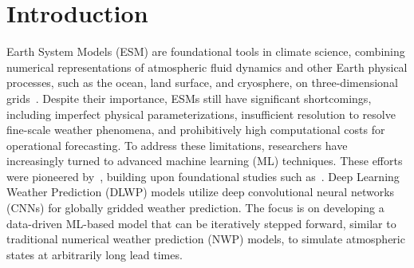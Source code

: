 \documentclass{article}
\begin{document}
\section{Introduction}
    Earth System Models (ESM) are foundational tools in climate science, combining numerical representations of atmospheric fluid dynamics and other Earth physical processes, such as the ocean, land surface, and cryosphere, on three-dimensional grids~\cite{erfani2024spatiotemporal}. Despite their importance, ESMs still have significant shortcomings, including imperfect physical parameterizations, insufficient resolution to resolve fine-scale weather phenomena, and prohibitively high computational costs for operational forecasting. To address these limitations, researchers have increasingly turned to advanced machine learning (ML) techniques. These efforts were pioneered by~\cite{weyn2019can,weyn2020improving,weyn2021sub}, building upon foundational studies such as~\cite{dueben2018challenges,scher2018toward,scher2018predicting,scher2019weather}. Deep Learning Weather Prediction (DLWP) models utilize deep convolutional neural networks (CNNs) for globally gridded weather prediction. The focus is on developing a data-driven ML-based model that can be iteratively stepped forward, similar to traditional numerical weather prediction (NWP) models, to simulate atmospheric states at arbitrarily long lead times. 
\end{document}
